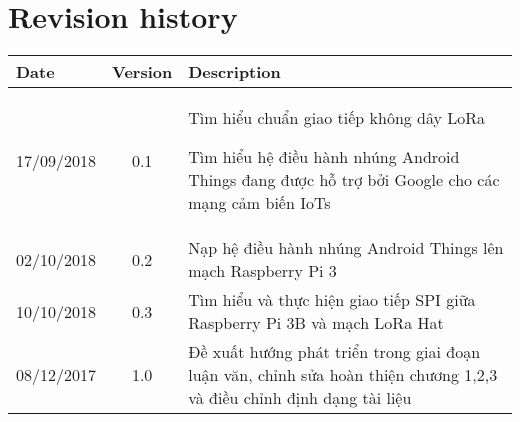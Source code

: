 \documentclass[12pt,a4paper,oneside,openright]{Book}
\numberwithin{subsection}{section}
\theoremstyle{definition}
\theoremstyle{plain}
\theoremstyle{definition}
\theoremstyle{definition}
\theoremstyle{remark}
\theoremstyle{definition}
\begin{document}
\newcommand\blankpage{%
	\null
	\thispagestyle{empty}%
	\addtocounter{page}{-1}%
	\begin{center}
	\end{center}  
	\newpage  
}
\blankpage

\section*{Revision history }
\begin{center}
	\begin{table}[!h]
		\begin{tabular}{|l|c|p{9cm}|}
			\hline
			\textbf{Date} & \textbf{Version} &\textbf{ Description} \\ 
			\hline
			17/09/2018 & 0.1 & Tìm hiểu chuẩn giao tiếp không dây LoRa 
			
			Tìm hiểu hệ điều hành nhúng Android Things đang được hỗ trợ bởi Google cho các mạng cảm biến IoTs\\
			\hline
			02/10/2018 & 0.2 & Nạp hệ điều hành nhúng Android Things lên mạch Raspberry Pi 3\\ 
			\hline
			10/10/2018 & 0.3 & Tìm hiểu và thực hiện giao tiếp SPI giữa Raspberry Pi 3B và mạch LoRa Hat\\ 
			\hline
			08/12/2017 & 1.0 & Đề xuất hướng phát triển trong giai đoạn luận văn, chỉnh sửa hoàn thiện chương 1,2,3 và điều chỉnh định dạng tài liệu\\ 
			\hline
		\end{tabular}
	\end{table}
\end{center}

\newpage

\tableofcontents


\listoffigures
\listoftables







\end{document}
